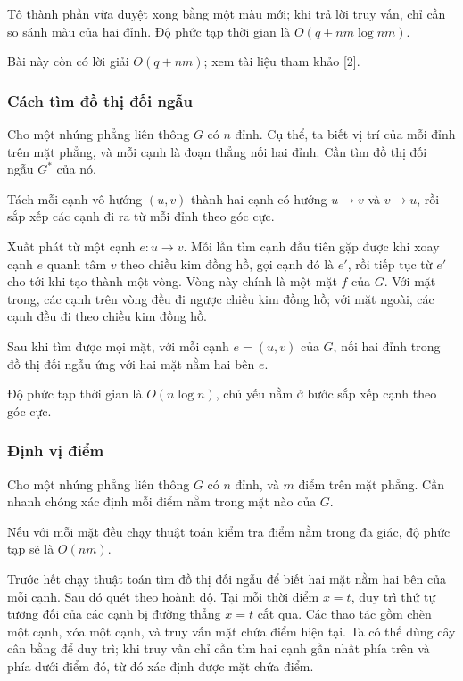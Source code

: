 \documentclass[11pt]{article}
\begin{document}
Tô thành phần vừa duyệt xong bằng một màu mới; khi trả lời truy vấn, chỉ cần so
sánh màu của hai đỉnh. Độ phức tạp thời gian là $O(q+nm\log nm)$.

Bài này còn có lời giải $O(q+nm)$; xem tài liệu tham khảo [2].

\subsubsection{Cách tìm đồ thị đối ngẫu}

Cho một nhúng phẳng liên thông $G$ có $n$ đỉnh. Cụ thể, ta biết vị trí của mỗi
đỉnh trên mặt phẳng, và mỗi cạnh là đoạn thẳng nối hai đỉnh. Cần tìm đồ thị đối
ngẫu $G^*$ của nó.

Tách mỗi cạnh vô hướng $(u,v)$ thành hai cạnh có hướng $u\to v$ và $v\to u$,
rồi sắp xếp các cạnh đi ra từ mỗi đỉnh theo góc cực.

Xuất phát từ một cạnh $e:u\to v$. Mỗi lần tìm cạnh đầu tiên gặp được khi xoay
cạnh $e$ quanh tâm $v$ theo chiều kim đồng hồ, gọi cạnh đó là $e'$, rồi tiếp tục
từ $e'$ cho tới khi tạo thành một vòng. Vòng này chính là một mặt $f$ của $G$.
Với mặt trong, các cạnh trên vòng đều đi ngược chiều kim đồng hồ; với mặt ngoài,
các cạnh đều đi theo chiều kim đồng hồ.

Sau khi tìm được mọi mặt, với mỗi cạnh $e=(u,v)$ của $G$, nối hai đỉnh trong đồ
thị đối ngẫu ứng với hai mặt nằm hai bên $e$.

Độ phức tạp thời gian là $O(n\log n)$, chủ yếu nằm ở bước sắp xếp cạnh theo góc
cực.

\subsubsection{Định vị điểm}

Cho một nhúng phẳng liên thông $G$ có $n$ đỉnh, và $m$ điểm trên mặt phẳng. Cần
nhanh chóng xác định mỗi điểm nằm trong mặt nào của $G$.

Nếu với mỗi mặt đều chạy thuật toán kiểm tra điểm nằm trong đa giác, độ phức
tạp sẽ là $O(nm)$.

Trước hết chạy thuật toán tìm đồ thị đối ngẫu để biết hai mặt nằm hai bên của
mỗi cạnh. Sau đó quét theo hoành độ. Tại mỗi thời điểm $x=t$, duy trì thứ tự
tương đối của các cạnh bị đường thẳng $x=t$ cắt qua. Các thao tác gồm chèn một
cạnh, xóa một cạnh, và truy vấn mặt chứa điểm hiện tại. Ta có thể dùng cây cân
bằng để duy trì; khi truy vấn chỉ cần tìm hai cạnh gần nhất phía trên và phía
dưới điểm đó, từ đó xác định được mặt chứa điểm.
\end{document}
